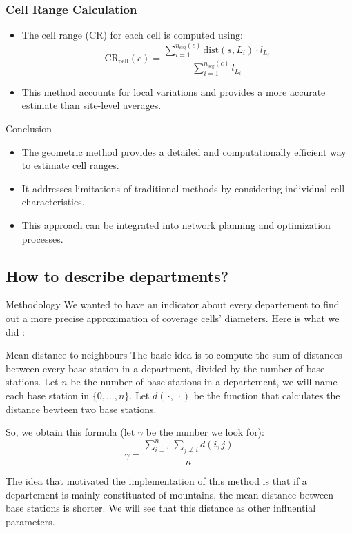 \begin{frame}
\frametitle{Cell Range Calculation}
\begin{itemize}
    \item The cell range (CR) for each cell is computed using:
    \begin{equation}
        \text{CR}_{\text{cell}}(c) = \frac{\sum_{i=1}^{n_{\text{seg}}(c)} \text{dist}(s, L_i) \cdot l_{L_i}}{\sum_{i=1}^{n_{\text{seg}}(c)} l_{L_i}}
    \end{equation}
    \item This method accounts for local variations and provides a more accurate estimate than site-level averages.
\end{itemize}
\begin{block}{Conclusion}
    \begin{itemize}
        \item The geometric method provides a detailed and computationally efficient way to estimate cell ranges.
        \item It addresses limitations of traditional methods by considering individual cell characteristics.
        \item This approach can be integrated into network planning and optimization processes.
    \end{itemize}
\end{block}
\end{frame}

\subsection{How to describe departments?}
\insertsubsectionframe

\begin{frame}{Methodology}
    We wanted to have an indicator about every departement to find out a more precise approximation of coverage cells' diameters.
    Here is what we did :

    \begin{block}{Mean distance to neighbours}
        The basic idea is to compute the sum of distances between every base station in a department, divided by the number of base stations.
        Let $n$ be the number of base stations in a departement, we will name each base station in $\{0,\dots ,n\}$. Let $d(\,\cdotp,\,\cdotp)$ be the function that calculates the distance bewteen two base stations.
        
        So, we obtain this formula (let $\gamma$ be the number we look for):
        $$
            \gamma = \frac{\sum_{i=1}^{n} \sum_{j\neq i} d(i,j)}{n}
        $$
    \end{block}

    The idea that motivated the implementation of this method is that if a departement is mainly constituated of mountains, the mean distance between base stations is shorter.
    We will see that this distance as other influential parameters.
\end{frame}

